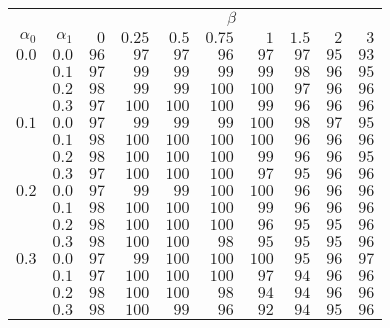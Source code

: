 \begin{tabular}{rr|rrrrrrrr}
\hline\hline
 && \multicolumn{8}{c}{$\beta$}\\
 $\alpha_0$ & $\alpha_1$ & $0$ & $0.25$ & $0.5$ & $0.75$ & $1$ & $1.5$ & $2$ & $3$ \\ 
 \hline
$0.0$ & $0.0$ & $96$ & $97$ & $97$ & $96$ & $97$ & $97$ & $95$ & $93$\\ 
 & $0.1$ & $97$ & $99$ & $99$ & $99$ & $99$ & $98$ & $96$ & $95$\\ 
 & $0.2$ & $98$ & $99$ & $99$ & $100$ & $100$ & $97$ & $96$ & $96$\\ 
 & $0.3$ & $97$ & $100$ & $100$ & $100$ & $99$ & $96$ & $96$ & $96$\\ 
\hline 
 $0.1$ & $0.0$ & $97$ & $99$ & $99$ & $99$ & $100$ & $98$ & $97$ & $95$\\ 
 & $0.1$ & $98$ & $100$ & $100$ & $100$ & $100$ & $96$ & $96$ & $96$\\ 
 & $0.2$ & $98$ & $100$ & $100$ & $100$ & $99$ & $96$ & $96$ & $95$\\ 
 & $0.3$ & $97$ & $100$ & $100$ & $100$ & $97$ & $95$ & $96$ & $96$\\ 
\hline 
 $0.2$ & $0.0$ & $97$ & $99$ & $99$ & $100$ & $100$ & $96$ & $96$ & $96$\\ 
 & $0.1$ & $98$ & $100$ & $100$ & $100$ & $99$ & $96$ & $96$ & $96$\\ 
 & $0.2$ & $98$ & $100$ & $100$ & $100$ & $96$ & $95$ & $95$ & $96$\\ 
 & $0.3$ & $98$ & $100$ & $100$ & $98$ & $95$ & $95$ & $95$ & $96$\\ 
\hline 
 $0.3$ & $0.0$ & $97$ & $99$ & $100$ & $100$ & $100$ & $95$ & $96$ & $97$\\ 
 & $0.1$ & $97$ & $100$ & $100$ & $100$ & $97$ & $94$ & $96$ & $96$\\ 
 & $0.2$ & $98$ & $100$ & $100$ & $98$ & $94$ & $94$ & $96$ & $96$\\ 
 & $0.3$ & $98$ & $100$ & $99$ & $96$ & $92$ & $94$ & $95$ & $96$\\ 
 \hline 
 \end{tabular}